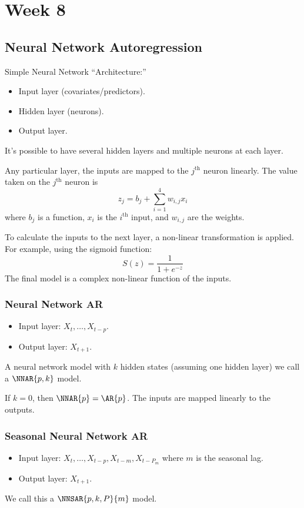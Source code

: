 \chapter{Week 8}
\section{Neural Network Autoregression}
Simple Neural Network ``Architecture:''
\begin{itemize}
    \item Input layer (covariates/predictors).
    \item Hidden layer (neurons).
    \item Output layer.
\end{itemize}
It's possible to have several hidden layers and multiple
neurons at each layer.

Any particular layer, the inputs are mapped to the $ j^{\text{th}} $
neuron linearly. The value taken on the $ j^{\text{th}} $
neuron is
\[ z_j=b_j+\sum_{i=1}^{4} w_{i,j}x_{i} \]
where $ b_j $ is a function, $ x_i $ is the $ i^{\text{th}} $ input, and $ w_{i,j} $
are the weights.

To calculate the inputs to the next layer, a non-linear transformation
is applied. For example, using the sigmoid function:
\[ S(z)=\frac{1}{1+e^{-z}} \]
The final model is a complex non-linear function of the inputs.

\subsection*{Neural Network AR}
\begin{itemize}
    \item Input layer: $ X_t,\ldots,X_{t-p} $.
    \item Output layer: $ X_{t+1} $.
\end{itemize}
A neural network model with $ k $ hidden states (assuming one hidden layer)
we call a $ \NNAR{p,k} $ model.
\begin{Remark}{}{}
    If $ k=0 $, then $ \NNAR{p}=\AR{p} $. The inputs are mapped
    linearly to the outputs.
\end{Remark}
\subsection*{Seasonal Neural Network AR}
\begin{itemize}
    \item Input layer: $ X_{t},\ldots,X_{t-p},X_{t-m},X_{t-P_m} $
          where $ m $ is the seasonal lag.
    \item Output layer: $ X_{t+1} $.
\end{itemize}
We call this a $ \NNSAR{p,k,P}{m} $ model.


